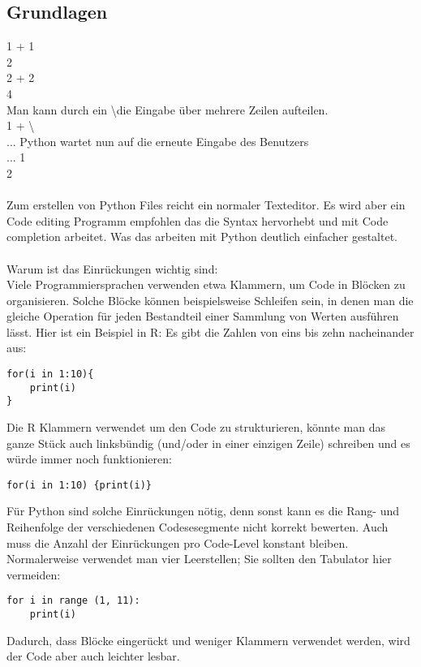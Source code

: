 \documentclass{article}
\begin{document}
\subsection{Grundlagen}
1 + 1\\
2\\
2 + 2\\
4\\
Man kann durch ein \textbackslash die Eingabe über mehrere Zeilen aufteilen.\\
1 + \textbackslash \\
... Python wartet nun auf die erneute Eingabe des Benutzers\\
... 1\\
2\\\\
\newpage
Zum erstellen von Python Files reicht ein normaler Texteditor. Es wird aber ein Code editing Programm empfohlen das die Syntax hervorhebt und mit Code completion arbeitet. Was das arbeiten mit Python deutlich einfacher gestaltet.\\\\
Warum ist das Einrückungen wichtig sind:\\
Viele Programmiersprachen verwenden etwa Klammern, um Code in Blöcken zu organisieren. Solche Blöcke können beispielsweise Schleifen sein, in denen man die gleiche Operation für jeden Bestandteil einer Sammlung von Werten ausführen lässt. Hier ist ein Beispiel in R: Es gibt die Zahlen von eins bis zehn nacheinander aus:\\
\begin{verbatim}
for(i in 1:10){
    print(i)
}
\end{verbatim}
Die R Klammern verwendet um den Code zu strukturieren, könnte man das ganze Stück auch linksbündig (und/oder in einer einzigen Zeile) schreiben und es würde immer noch funktionieren:\\
\begin{verbatim}
for(i in 1:10) {print(i)}
\end{verbatim}
Für Python sind solche Einrückungen nötig, denn sonst kann es die Rang- und Reihenfolge der verschiedenen Codesesegmente nicht korrekt bewerten. Auch muss die Anzahl der Einrückungen pro Code-Level konstant bleiben. Normalerweise verwendet man vier Leerstellen; Sie sollten den Tabulator hier vermeiden:\\
\begin{verbatim}
for i in range (1, 11):
    print(i)
\end{verbatim}
Dadurch, dass Blöcke eingerückt und weniger Klammern verwendet werden, wird der Code aber auch leichter lesbar.\\
\end{document}
